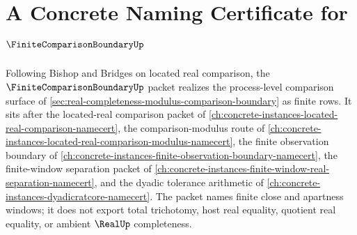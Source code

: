 \chapter{A Concrete Naming Certificate for $\FiniteComparisonBoundaryUp$}
\label{ch:concrete-instances-finite-comparison-boundary-namecert}

Following Bishop and Bridges on located real comparison, the $\FiniteComparisonBoundaryUp$ packet realizes the process-level comparison surface of \autoref{sec:real-completeness-modulus-comparison-boundary} as finite rows. It sits after the located-real comparison packet of \autoref{ch:concrete-instances-located-real-comparison-namecert}, the comparison-modulus route of \autoref{ch:concrete-instances-located-real-comparison-modulus-namecert}, the finite observation boundary of \autoref{ch:concrete-instances-finite-observation-boundary-namecert}, the finite-window separation packet of \autoref{ch:concrete-instances-finite-window-real-separation-namecert}, and the dyadic tolerance arithmetic of \autoref{ch:concrete-instances-dyadicratcore-namecert}. The packet names finite close and apartness windows; it does not export total trichotomy, host real equality, quotient real equality, or ambient $\RealUp$ completeness.

